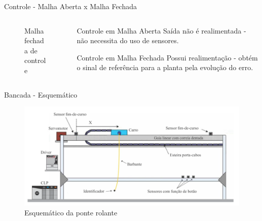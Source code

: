 \documentclass[10pt]{beamer}
\begin{document}
\begin{frame}[fragile]{Controle - Malha Aberta x Malha Fechada}
\begin{columns}[T,onlytextwidth]
\begin{column}{.5\textwidth}
\begin{figure}[!ht]
\caption{Malha fechada de controle\label{mfechadatikz}}
\end{figure}
\end{column}

\begin{column}{.5\textwidth}

\begin{block}{Controle em Malha Aberta}
Saída não é realimentada - não necessita do uso de sensores.
\newline
\newline
\newline
\end{block}

\begin{block}{Controle em Malha Fechada}
Possui realimentação - obtém o sinal de referência para a planta pela evolução do erro.\end{block}

\end{column}

\end{columns}
\end{frame}

\begin{frame}[fragile]{Bancada - Esquemático}
\begin{figure}[!ht]
	\centering
	\includegraphics[width=.9\linewidth]{figures/fundamentos/bancadaEsquematico}
	\caption{Esquemático da ponte rolante \cite{redytton}}
	\label{bancadaesq}
\end{figure}
\end{frame}
\end{document}
